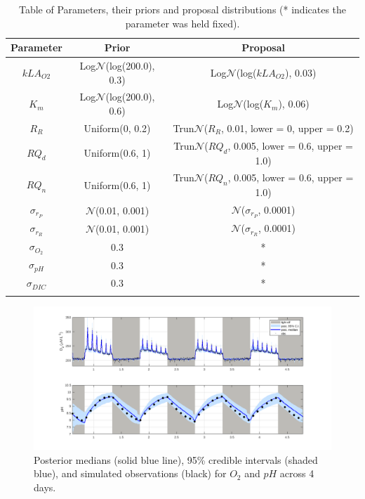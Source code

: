 \documentclass{ruthesis}
\begin{document}
\begin{longtable}{|c | c  |  c|}
	\hline
	\bfseries{Parameter} & \bfseries{Prior} &  \bfseries{Proposal} \\ \hline
	$kLA_{O2}$  & Log$\mathcal{N}$(log(200.0), 0.3)  & Log$\mathcal{N}$(log($kLA_{O2}$), 0.03) \\
	$K_m$ 		&  Log$\mathcal{N}$(log(200.0), 0.6) & Log$\mathcal{N}$(log($K_m$), 0.06) \\
	$R_R$  		& Uniform(0, 0.2) &  Trun$\mathcal{N}$($R_R$, 0.01, lower = 0, upper = 0.2) \\
	$RQ_d$  	& Uniform(0.6, 1) &  Trun$\mathcal{N}$($RQ_d$, 0.005, lower = 0.6, upper = 1.0)\\
	$RQ_n$  	& Uniform(0.6, 1) &  Trun$\mathcal{N}$($RQ_n$, 0.005, lower = 0.6, upper = 1.0)\\
	$\sigma_{r_P}$ & $\mathcal{N}$(0.01, 0.001)   & $\mathcal{N}$($\sigma_{r_P}$, 0.0001)   \\
	$\sigma_{r_R}$ & $\mathcal{N}$(0.01, 0.001)   & $\mathcal{N}$($\sigma_{r_R}$, 0.0001)   \\
	$\sigma_{O_2}$ 	& 0.3 	& * \\
	$\sigma_{pH}$ 	& 0.3 	& * \\
	$\sigma_{DIC}$ 	& 0.3 	& * \\	
	\hline
	\caption[.]{Table of Parameters, their priors and proposal distributions (* indicates the parameter was held fixed).}
	\label{tab:micro_sim_priors2}
\end{longtable}




\begin{figure}
	\centerline{\includegraphics[width=1.2\textwidth]{images_microalgae/posterior_plots_with_fake_data_other/O2_pH}}
	\caption[.]{Posterior medians (solid blue line), 95\% credible intervals (shaded blue), and simulated observations (black) for $O_2$ and $pH$ across 4 days.}
	\label{fig:pos_sim_O2_pH_other}
\end{figure}
\end{document}
